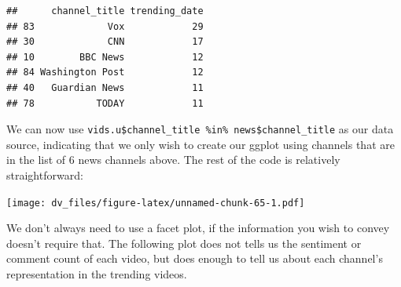 \documentclass[]{article}
\newenvironment{Shaded}{\begin{snugshade}}{\end{snugshade}}
\newcommand{\DataTypeTok}[1]{\textcolor[rgb]{0.13,0.29,0.53}{#1}}
\newcommand{\DecValTok}[1]{\textcolor[rgb]{0.00,0.00,0.81}{#1}}
\newcommand{\KeywordTok}[1]{\textcolor[rgb]{0.13,0.29,0.53}{\textbf{#1}}}
\newcommand{\NormalTok}[1]{#1}
\newcommand{\OperatorTok}[1]{\textcolor[rgb]{0.81,0.36,0.00}{\textbf{#1}}}
\newcommand{\StringTok}[1]{\textcolor[rgb]{0.31,0.60,0.02}{#1}}
\begin{document}
\begin{verbatim}
##      channel_title trending_date
## 83             Vox            29
## 30             CNN            17
## 10        BBC News            12
## 84 Washington Post            12
## 40   Guardian News            11
## 78           TODAY            11
\end{verbatim}

We can now use
\texttt{vids.u\$channel\_title\ \%in\%\ news\$channel\_title} as our
data source, indicating that we only wish to create our ggplot using
channels that are in the list of 6 news channels above. The rest of the
code is relatively straightforward:

\begin{Shaded}
\end{Shaded}

\texttt{[image: dv\_files/figure-latex/unnamed-chunk-65-1.pdf]}

We don't always need to use a facet plot, if the information you wish to
convey doesn't require that. The following plot does not tells us the
sentiment or comment count of each video, but does enough to tell us
about each channel's representation in the trending videos.

\begin{Shaded}
\end{Shaded}
\end{document}
